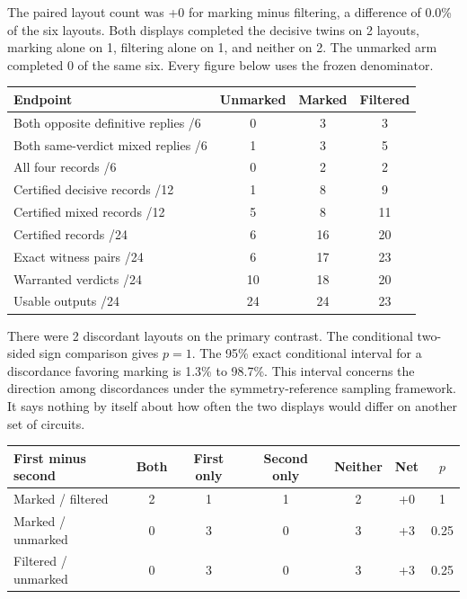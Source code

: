 \documentclass[12pt,letterpaper]{article}
\begin{document}
The paired layout count was +0 for marking minus filtering, a difference of 0.0\% of the six layouts. Both displays completed the decisive twins on 2 layouts, marking alone on 1, filtering alone on 1, and neither on 2. The unmarked arm completed 0 of the same six. Every figure below uses the frozen denominator.

\begin{center}{\small\setlength{\tabcolsep}{4pt}\begin{tabularx}{\linewidth}{@{}Yccc@{}}\toprule
Endpoint & Unmarked & Marked & Filtered\\ \midrule
Both opposite definitive replies /6 & 0 & 3 & 3\\
Both same-verdict mixed replies /6 & 1 & 3 & 5\\
All four records /6 & 0 & 2 & 2\\
Certified decisive records /12 & 1 & 8 & 9\\
Certified mixed records /12 & 5 & 8 & 11\\
Certified records /24 & 6 & 16 & 20\\
Exact witness pairs /24 & 6 & 17 & 23\\
Warranted verdicts /24 & 10 & 18 & 20\\
Usable outputs /24 & 24 & 24 & 23\\\bottomrule\end{tabularx}}\end{center}

There were 2 discordant layouts on the primary contrast. The conditional two-sided sign comparison gives $p=1$. The 95\% exact conditional interval for a discordance favoring marking is 1.3\% to 98.7\%. This interval concerns the direction among discordances under the symmetry-reference sampling framework. It says nothing by itself about how often the two displays would differ on another set of circuits.

\begin{center}{\footnotesize\setlength{\tabcolsep}{4pt}\begin{tabularx}{\linewidth}{@{}Ycccccc@{}}\toprule
First minus second & Both & First only & Second only & Neither & Net & $p$\\ \midrule
Marked / filtered & 2 & 1 & 1 & 2 & +0 & 1\\
Marked / unmarked & 0 & 3 & 0 & 3 & +3 & 0.25\\
Filtered / unmarked & 0 & 3 & 0 & 3 & +3 & 0.25\\\bottomrule\end{tabularx}}\end{center}
\end{document}
